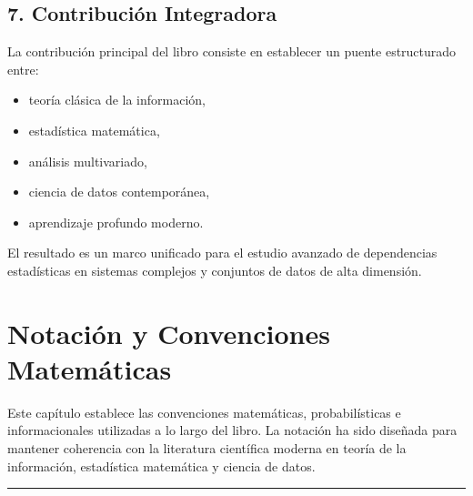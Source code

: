 \documentclass[letterpaper,10pt,english]{jupyterBook}
\begin{document}
\section{7. Contribución Integradora}
\label{\detokenize{00_frontmatter/contributions:contribucion-integradora}}
\sphinxAtStartPar
La contribución principal del libro consiste en establecer un puente estructurado entre:
\begin{itemize}
\item {} 
\sphinxAtStartPar
teoría clásica de la información,

\item {} 
\sphinxAtStartPar
estadística matemática,

\item {} 
\sphinxAtStartPar
análisis multivariado,

\item {} 
\sphinxAtStartPar
ciencia de datos contemporánea,

\item {} 
\sphinxAtStartPar
aprendizaje profundo moderno.

\end{itemize}

\sphinxAtStartPar
El resultado es un marco unificado para el estudio avanzado de dependencias estadísticas en sistemas complejos y conjuntos de datos de alta dimensión.

\sphinxstepscope


\chapter{Notación y Convenciones Matemáticas}
\label{\detokenize{00_frontmatter/notation:notacion-y-convenciones-matematicas}}\label{\detokenize{00_frontmatter/notation::doc}}
\sphinxAtStartPar
Este capítulo establece las convenciones matemáticas, probabilísticas e informacionales utilizadas a lo largo del libro. La notación ha sido diseñada para mantener coherencia con la literatura científica moderna en teoría de la información, estadística matemática y ciencia de datos.


\bigskip\hrule\bigskip
\end{document}

